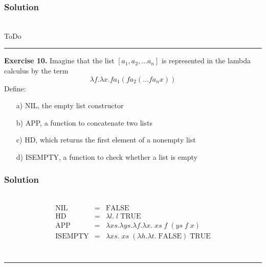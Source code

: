 \documentclass{article}
\newcommand{\lm}[1]{\lambda #1 .}
\newcommand{\qed}{\begin{flushright}\rule{0.7em}{0.7em}\end{flushright}}
\begin{document}
\subsubsection*{Solution} \\
ToDo
\qed
\textbf{Exercise 10.} Imagine that the list $\left[ a_1, a_2, \ldots a_n \right]$ is represented in the lambda calculus by the term $$\lm{f}\lm{x}f a_1 (f a_2 ( \ldots f a_n x ))$$
Define:
\begin{enumerate}
    \item[a)] NIL, the empty list constructor
    \item[b)] APP, a function to concatenate two lists
    \item[c)] HD, which returns the first element of a nonempty list
    \item[d)] ISEMPTY, a function to check whether a list is empty
\end{enumerate}
\subsubsection*{Solution} \\
\begin{equation*}
\begin{array}{lll}
      \text{NIL} & =  & \text{FALSE}  \\
      \text{HD} & = &  \lm{l} \; l \; \text{TRUE}\\
      \text{APP} & = &  \lm{xs} \lm{ys} \lm{f} \lm{x} \; xs \; f \; (ys \; f \; x)\\
      \text{ISEMPTY} & = &  \lm{xs} \; xs \; (\lm{h} \lm{t} \; \text{FALSE}) \; \text{TRUE}\\
\end{array}
\end{equation*}\\
\qed
\end{document}
